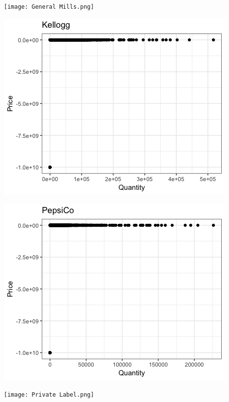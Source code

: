 \documentclass{article}
\begin{document}
\texttt{[image: General Mills.png]}

\includegraphics[scale=.5]{Kellogg.png}

\includegraphics[scale=.5]{PepsiCo.png}

\texttt{[image: Private Label.png]}
\end{document}
